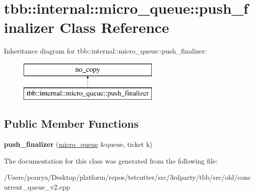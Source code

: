 \hypertarget{classtbb_1_1internal_1_1micro__queue_1_1push__finalizer}{}\section{tbb\+:\+:internal\+:\+:micro\+\_\+queue\+:\+:push\+\_\+finalizer Class Reference}
\label{classtbb_1_1internal_1_1micro__queue_1_1push__finalizer}
Inheritance diagram for tbb\+:\+:internal\+:\+:micro\+\_\+queue\+:\+:push\+\_\+finalizer\+:\begin{figure}[H]
\begin{center}
\leavevmode
\includegraphics[height=2.000000cm]{classtbb_1_1internal_1_1micro__queue_1_1push__finalizer}
\end{center}
\end{figure}
\subsection*{Public Member Functions}
\begin{DoxyCompactItemize}
\item 
\hypertarget{classtbb_1_1internal_1_1micro__queue_1_1push__finalizer_a15e212be2f095d6beccfc3a45de8b631}{}{\bfseries push\+\_\+finalizer} (\hyperlink{structtbb_1_1internal_1_1micro__queue}{micro\+\_\+queue} \&queue, ticket k)\label{classtbb_1_1internal_1_1micro__queue_1_1push__finalizer_a15e212be2f095d6beccfc3a45de8b631}

\end{DoxyCompactItemize}


The documentation for this class was generated from the following file\+:\begin{DoxyCompactItemize}
\item 
/\+Users/pourya/\+Desktop/platform/repos/tetcutter/src/3rdparty/tbb/src/old/concurrent\+\_\+queue\+\_\+v2.\+cpp\end{DoxyCompactItemize}
